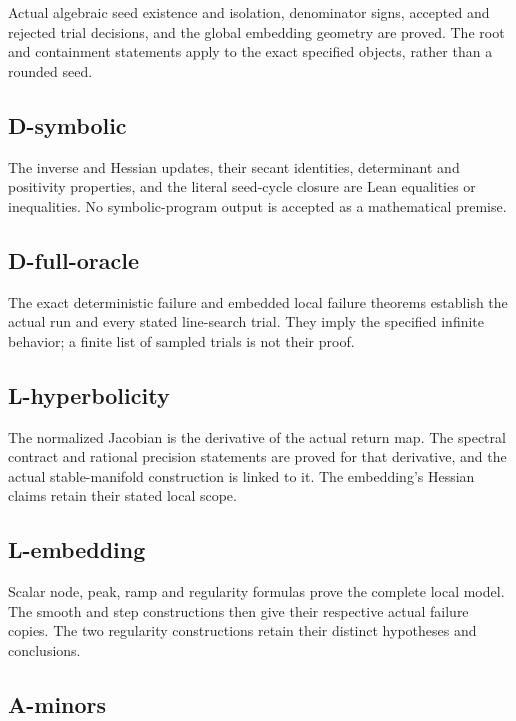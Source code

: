 Actual algebraic seed existence and isolation, denominator signs, accepted and rejected trial decisions, and the global embedding geometry are proved. The root and containment statements apply to the exact specified objects, rather than a rounded seed.

\subsection{D-symbolic}\label{d-symbolic}

The inverse and Hessian updates, their secant identities, determinant and positivity properties, and the literal seed-cycle closure are Lean equalities or inequalities. No symbolic-program output is accepted as a mathematical premise.

\subsection{D-full-oracle}\label{d-full-oracle}

The exact deterministic failure and embedded local failure theorems establish the actual run and every stated line-search trial. They imply the specified infinite behavior; a finite list of sampled trials is not their proof.

\subsection{L-hyperbolicity}\label{l-hyperbolicity}

The normalized Jacobian is the derivative of the actual return map. The spectral contract and rational precision statements are proved for that derivative, and the actual stable-manifold construction is linked to it. The embedding's Hessian claims retain their stated local scope.

\subsection{L-embedding}\label{l-embedding}

Scalar node, peak, ramp and regularity formulas prove the complete local model. The smooth and step constructions then give their respective actual failure copies. The two regularity constructions retain their distinct hypotheses and conclusions.

\subsection{A-minors}\label{a-minors}

